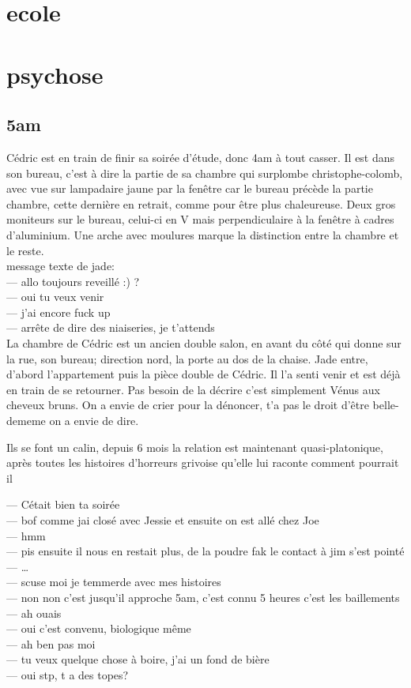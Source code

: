 \documentclass{article}
\begin{document}
\clearpage

\section{ecole}
\clearpage

\section{psychose}
\subsection{5am}
 Cédric est en train de finir sa soirée d'étude, donc 4am à tout casser. Il est
dans son bureau, c'est à dire la partie de sa chambre qui surplombe
christophe-colomb, avec vue sur lampadaire jaune par la fenêtre car le bureau
précède la partie chambre, cette dernière en retrait, comme pour être plus
chaleureuse. Deux gros moniteurs sur le bureau, celui-ci en V mais
perpendiculaire à la fenêtre à cadres d'aluminium. Une arche avec moulures
marque la distinction entre la chambre et le reste. \\

message texte de jade:\\
--- allo toujours reveillé :) ?\\
--- oui tu veux venir\\
--- j'ai encore fuck up\\
--- arrête de dire des niaiseries, je t'attends\\

La chambre de Cédric est un ancien double salon, en avant du côté qui donne sur
la rue, son bureau; direction nord, la porte au dos de la chaise. Jade entre, d'abord
l'appartement puis la pièce double de Cédric. Il l'a senti venir et est déjà en train
de se retourner. Pas besoin de la décrire c'est simplement Vénus aux cheveux
bruns. On a envie de crier pour la dénoncer, t'a pas le droit d'être
belle-dememe on a envie de dire.

Ils se font un calin, depuis 6 mois la relation est maintenant quasi-platonique,
après toutes les histoires d'horreurs grivoise qu'elle lui raconte comment
pourrait il

--- Cétait bien ta soirée\\
--- bof comme jai closé avec Jessie et ensuite on est allé chez Joe\\
--- hmm\\
--- pis ensuite il nous en restait plus, de la poudre fak le contact à jim s'est pointé\\
--- \ldots\\
--- scuse moi je temmerde avec mes histoires\\
--- non non c'est jusqu'il approche 5am, c'est connu 5 heures c'est les baillements\\
--- ah ouais\\
--- oui c'est convenu, biologique même\\
--- ah ben pas moi\\
--- tu veux quelque chose à boire, j'ai un fond de bière\\
--- oui stp, t a des topes?\\
\end{document}
